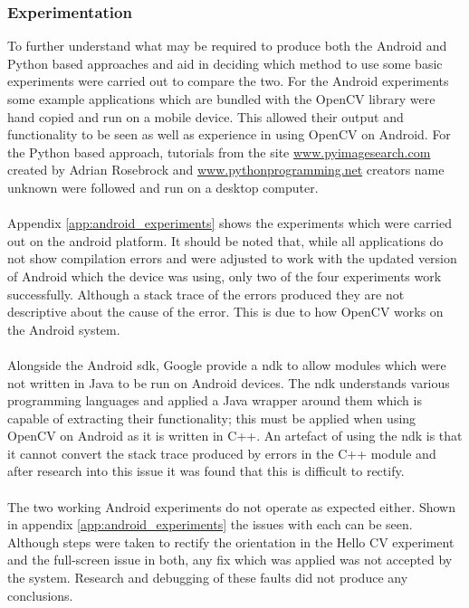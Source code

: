 	\subsubsection{Experimentation}
		To further understand what may be required to produce both the Android and Python based approaches and aid in deciding which method to use some basic experiments were carried out to compare the two. For the Android experiments some example applications which are bundled with the OpenCV library were hand copied and run on a mobile device. This allowed their output and functionality to be seen as well as experience in using OpenCV on Android. For the Python based approach, tutorials from the site \url{www.pyimagesearch.com} created by Adrian Rosebrock and \url{www.pythonprogramming.net} creators name unknown were followed and run on a desktop computer.
		\\\\
		Appendix \ref{app:android_experiments} shows the experiments which were carried out on the android platform. It should be noted that, while all applications do not show compilation errors and were adjusted to work with the updated version of Android which the device was using, only two of the four experiments work successfully. Although a stack trace of the errors produced they are not descriptive about the cause of the error. This is due to how OpenCV works on the Android system.
		\\\\
		Alongside the Android \gls{sdk}, Google provide a \gls{ndk} to allow modules which were not written in Java to be run on Android devices. The \gls{ndk} understands various programming languages and applied a Java wrapper around them which is capable of extracting their functionality; this must be applied when using OpenCV on Android as it is written in C++. An artefact of using the \gls{ndk} is that it cannot convert the stack trace produced by errors in the C++ module and after research into this issue it was found that this is difficult to rectify.
		\\\\
		The two working Android experiments do not operate as expected either. Shown in appendix \ref{app:android_experiments} the issues with each can be seen. Although steps were taken to rectify the orientation in the Hello CV experiment and the full-screen issue in both, any fix which was applied was not accepted by the system. Research and debugging of these faults did not produce any conclusions.
		\\\\

